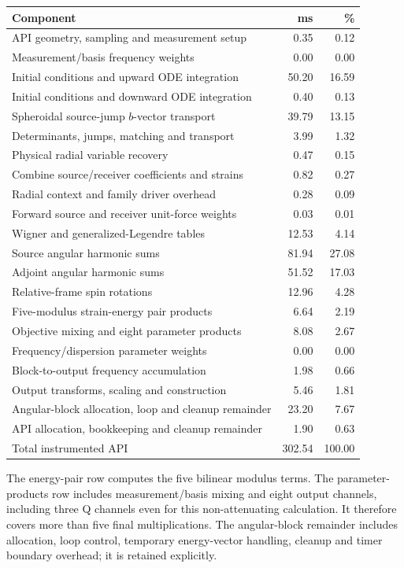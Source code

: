 \begin{center}\small
\begin{tabular}{p{}rr}\toprule Component & ms & \%\\\midrule
API geometry, sampling and measurement setup & 0.35 & 0.12\\
Measurement/basis frequency weights & 0.00 & 0.00\\
Initial conditions and upward ODE integration & 50.20 & 16.59\\
Initial conditions and downward ODE integration & 0.40 & 0.13\\
Spheroidal source-jump $b$-vector transport & 39.79 & 13.15\\
Determinants, jumps, matching and transport & 3.99 & 1.32\\
Physical radial variable recovery & 0.47 & 0.15\\
Combine source/receiver coefficients and strains & 0.82 & 0.27\\
Radial context and family driver overhead & 0.28 & 0.09\\
Forward source and receiver unit-force weights & 0.03 & 0.01\\
Wigner and generalized-Legendre tables & 12.53 & 4.14\\
Source angular harmonic sums & 81.94 & 27.08\\
Adjoint angular harmonic sums & 51.52 & 17.03\\
Relative-frame spin rotations & 12.96 & 4.28\\
Five-modulus strain-energy pair products & 6.64 & 2.19\\
Objective mixing and eight parameter products & 8.08 & 2.67\\
Frequency/dispersion parameter weights & 0.00 & 0.00\\
Block-to-output frequency accumulation & 1.98 & 0.66\\
Output transforms, scaling and construction & 5.46 & 1.81\\
Angular-block allocation, loop and cleanup remainder & 23.20 & 7.67\\
API allocation, bookkeeping and cleanup remainder & 1.90 & 0.63\\
\midrule Total instrumented API & 302.54 & 100.00\\\bottomrule\end{tabular}\end{center}
The energy-pair row computes the five bilinear modulus terms. The parameter-products row includes measurement/basis mixing and eight output channels, including three Q channels even for this non-attenuating calculation. It therefore covers more than five final multiplications. The angular-block remainder includes allocation, loop control, temporary energy-vector handling, cleanup and timer boundary overhead; it is retained explicitly.
